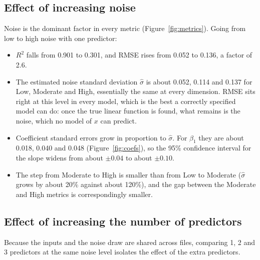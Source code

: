 \documentclass[11pt]{article}
\begin{document}
\subsection{Effect of increasing noise}

Noise is the dominant factor in every metric (Figure~\ref{fig:metrics}). Going from low to high noise with one predictor:
\begin{itemize}[leftmargin=1.4em]
\item $R^2$ falls from 0.901 to 0.301, and RMSE rises from 0.052 to 0.136, a factor of 2.6.
\item The estimated noise standard deviation $\hat\sigma$ is about 0.052, 0.114 and 0.137 for Low, Moderate and High, essentially the same at every dimension. RMSE sits right at this level in every model, which is the best a correctly specified model can do: once the true linear function is found, what remains is the noise, which no model of $x$ can predict.
\item Coefficient standard errors grow in proportion to $\hat\sigma$. For $\beta_1$ they are about 0.018, 0.040 and 0.048 (Figure~\ref{fig:coefs}), so the 95\% confidence interval for the slope widens from about $\pm 0.04$ to about $\pm 0.10$.
\item The step from Moderate to High is smaller than from Low to Moderate ($\hat\sigma$ grows by about 20\% against about 120\%), and the gap between the Moderate and High metrics is correspondingly smaller.
\end{itemize}

\subsection{Effect of increasing the number of predictors}
\label{sec:combination}

Because the inputs and the noise draw are shared across files, comparing 1, 2 and 3 predictors at the same noise level isolates the effect of the extra predictors.
\end{document}
